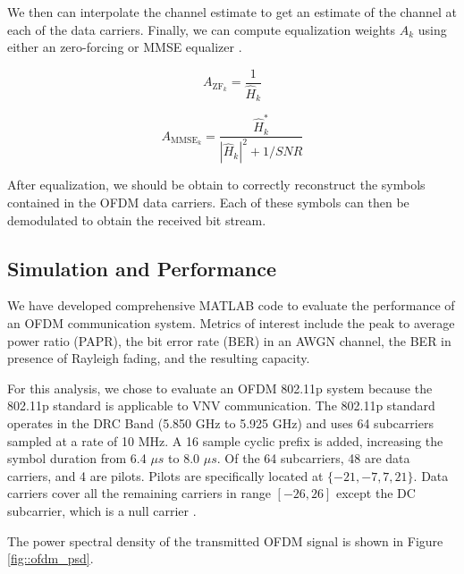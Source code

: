 \documentclass[conference]{IEEEtran}
\begin{document}
		We then can interpolate the channel estimate to get an estimate of the channel at each of the data carriers. Finally, we can compute equalization weights $A_k$ using either an zero-forcing or MMSE equalizer \cite{Vilar2015ImplementationOZ}.
		
		\begin{equation}
			A_{\text{ZF}_k} = \frac{1}{\hat{H}_k}
		\end{equation}
		
		\begin{equation}
			A_{\text{MMSE}_k} = \frac{\hat{H}_k^{*}}{|\hat{H}_k|^2 + 1/SNR}
		\end{equation}
		
		After equalization, we should be obtain to correctly reconstruct the symbols contained in the OFDM data carriers. Each of these symbols can then be demodulated to obtain the received bit stream.
		
\subsection {Simulation and Performance}
      
      We have developed comprehensive MATLAB code to evaluate the performance of an OFDM communication system. Metrics of interest include the peak to average power ratio (PAPR), the bit error rate (BER) in an AWGN channel, the BER in presence of Rayleigh fading, and the resulting capacity.
      
      For this analysis, we chose to evaluate an OFDM 802.11p system because the 802.11p standard is applicable to VNV communication. The 802.11p standard operates in the DRC Band (5.850 GHz to 5.925 GHz) and uses 64 subcarriers sampled at a rate of 10 MHz. A 16 sample cyclic prefix is added, increasing the symbol duration from 6.4 ${\mu}s$ to 8.0 ${\mu}s$. Of the 64 subcarriers, 48 are data carriers, and 4 are pilots. Pilots are specifically located at $\{-21, -7, 7, 21\}$. Data carriers cover all the remaining carriers in range $[-26, 26]$ except the DC subcarrier, which is a null carrier \cite{802_11p_abdelgader}.
      
    The power spectral density of the transmitted OFDM signal is shown in Figure \ref{fig::ofdm_psd}.
    
\end{document}
